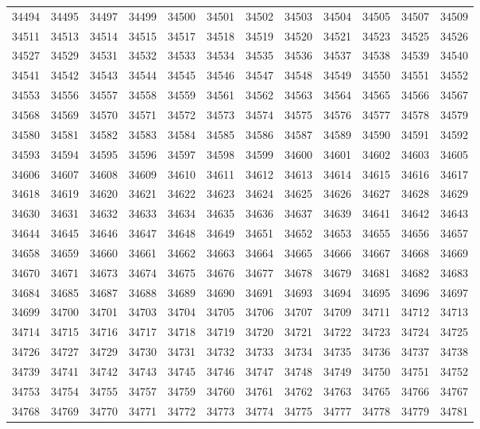\begin{center}
\begin{longtable}{llllllllllll}
34494 &34495 &34497 &34499 &34500 &34501 &34502 &34503 &34504 &34505 &34507 &34509 \\
34511 &34513 &34514 &34515 &34517 &34518 &34519 &34520 &34521 &34523 &34525 &34526 \\
34527 &34529 &34531 &34532 &34533 &34534 &34535 &34536 &34537 &34538 &34539 &34540 \\
34541 &34542 &34543 &34544 &34545 &34546 &34547 &34548 &34549 &34550 &34551 &34552 \\
34553 &34556 &34557 &34558 &34559 &34561 &34562 &34563 &34564 &34565 &34566 &34567 \\
34568 &34569 &34570 &34571 &34572 &34573 &34574 &34575 &34576 &34577 &34578 &34579 \\
34580 &34581 &34582 &34583 &34584 &34585 &34586 &34587 &34589 &34590 &34591 &34592 \\
34593 &34594 &34595 &34596 &34597 &34598 &34599 &34600 &34601 &34602 &34603 &34605 \\
34606 &34607 &34608 &34609 &34610 &34611 &34612 &34613 &34614 &34615 &34616 &34617 \\
34618 &34619 &34620 &34621 &34622 &34623 &34624 &34625 &34626 &34627 &34628 &34629 \\
34630 &34631 &34632 &34633 &34634 &34635 &34636 &34637 &34639 &34641 &34642 &34643 \\
34644 &34645 &34646 &34647 &34648 &34649 &34651 &34652 &34653 &34655 &34656 &34657 \\
34658 &34659 &34660 &34661 &34662 &34663 &34664 &34665 &34666 &34667 &34668 &34669 \\
34670 &34671 &34673 &34674 &34675 &34676 &34677 &34678 &34679 &34681 &34682 &34683 \\
34684 &34685 &34687 &34688 &34689 &34690 &34691 &34693 &34694 &34695 &34696 &34697 \\
34699 &34700 &34701 &34703 &34704 &34705 &34706 &34707 &34709 &34711 &34712 &34713 \\
34714 &34715 &34716 &34717 &34718 &34719 &34720 &34721 &34722 &34723 &34724 &34725 \\
34726 &34727 &34729 &34730 &34731 &34732 &34733 &34734 &34735 &34736 &34737 &34738 \\
34739 &34741 &34742 &34743 &34745 &34746 &34747 &34748 &34749 &34750 &34751 &34752 \\
34753 &34754 &34755 &34757 &34759 &34760 &34761 &34762 &34763 &34765 &34766 &34767 \\
34768 &34769 &34770 &34771 &34772 &34773 &34774 &34775 &34777 &34778 &34779 &34781 \\

\end{longtable}
\end{center}
